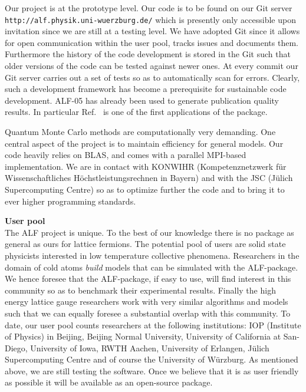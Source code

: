 \documentclass[12pt]{article}
\begin{document}
Our project is at the prototype level.  Our code is to be found  on our Git server  \texttt{http://alf.physik.uni-wuerzburg.de/} which is presently only accessible  upon invitation since we are still at a testing level.  We have adopted Git since it allows for open communication within the user pool,  tracks issues and  documents them.   Furthermore the history of the code development is stored in the Git such that older versions of the code can be tested against newer ones.   At every commit our Git server carries out a set of tests so as to automatically scan for errors.   Clearly, such a development framework  has  become a prerequisite for sustainable code development.  ALF-05 has already been used to generate publication quality results. In particular  Ref.~\cite{Assaad16}   is one of the first applications of the package.  

Quantum Monte Carlo methods are  computationally very demanding. One central aspect of the project is to maintain  efficiency for general models.  Our code  heavily relies on BLAS, and comes with a parallel MPI-based implementation. We are in contact with KONWIHR   (Kom\-pe\-tenz\-netz\-werk f\"ur Wissen\-schaft\-liches H\"ochst\-leistungs\-rechnen in Bayern)  and with the JSC (J\"ulich Supercomputing Centre)  so as to optimize further the code and to bring  it to ever higher programming standards.  

{\bf User pool } \\ 
The ALF project  is unique. To the best of our knowledge  there is no package as general as ours for lattice fermions. The potential pool of users are solid state physicists interested in low  temperature collective phenomena.    Researchers in the domain of cold atoms {\it build} models that can be simulated with the ALF-package. We hence foresee that the ALF-package, if easy to use, will find interest in this community so as to benchmark their experimental results. Finally  the high energy lattice gauge  researchers work with very similar algorithms and models such that we can equally  foresee  a substantial overlap with this community.   To date,  our user pool counts researchers at the following institutions:  IOP (Institute of Physics) in Beijing,  Beijing Normal University, University of California at San-Diego,  University of Iowa,  RWTH Aachen, University of Erlangen, J\"ulich Supercomputing Centre and of course the  University of W\"urzburg.   As mentioned above,  we are still testing the software. Once we believe that it is as user friendly as possible it will be available as an open-source package. 
\end{document}

